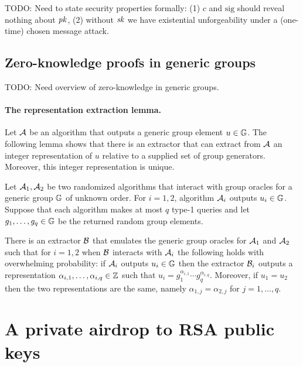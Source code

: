 \documentclass[11pt]{article}
\begin{document}
TODO: Need to state security properties formally: 
(1) $c$ and $\text{sig}$ should reveal nothing about $\mathit{pk}$,
(2) without $\mathit{sk}$ we have existential unforgeability under a 
(one-time) chosen message attack.


\subsection{Zero-knowledge proofs in generic groups}

TODO: Need overview of zero-knowledge in generic groups. 

\paragraph{The representation extraction lemma.}
Let $\mathcal{A}$ be an algorithm that outputs 
a generic group element $u \in \mathbb G$.
The following lemma shows that there is an extractor that
can extract from $\mathcal{A}$ an integer representation of $u$
relative to a supplied set of group generators.
Moreover, this integer representation is unique.

\begin{lemma}
\label{lem:unique}
Let $\mathcal{A}_1, \mathcal{A}_2$ be two randomized algorithms that interact
with group oracles for a generic group $\mathbb G$ of unknown order.
For $i=1,2$, algorithm $\mathcal{A}_i$ outputs $u_i \in \mathbb G$.
Suppose that each algorithm makes at most $q$ type-1 queries
and let $g_1,\ldots,g_q \in \mathbb G$ be the returned random group elements. 

There is an extractor $\mathcal{B}$ that emulates 
the generic group oracles for $\mathcal{A}_1$ and $\mathcal{A}_2$
such that for $i=1,2$ when $\mathcal{B}$ interacts with $\mathcal{A}_i$ 
the following holds with overwhelming probability:
if $\mathcal{A}_i$ outputs $u_i \in \mathbb G$ 
then the extractor $\mathcal{B}_i$ outputs a representation
$\alpha_{i,1},\ldots,\alpha_{i,q} \in \mathbb Z$
such that $u_i = g_1^{\alpha_{i,1}} \cdots g_q^{\alpha_{i,q}}$.
Moreover, if $u_1 = u_2$ then the two representations are the same,
namely $\alpha_{1,j} = \alpha_{2,j}$ for $j=1,\ldots,q$. 
\end{lemma}




\section{A private airdrop to RSA public keys}\label{sec:rsa}
\end{document}
